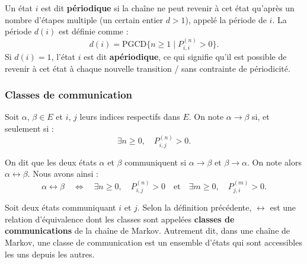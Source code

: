 \documentclass{article}
\begin{document}
\begin{tcolorbox}[colback=white,colframe=blue!80!black,title=État périodique]
Un état $i$ est dit \textbf{périodique} si la chaîne ne peut revenir à cet état qu'après un nombre d'étapes multiple (un certain entier $d > 1$), appelé la période de $i$. La période $d(i)$ est définie comme :
\[
d(i) = \text{PGCD}\{n \geq 1 \mid P_{i,i}^{(n)} > 0\}.
\]
Si $d(i) = 1$, l'état $i$ est dit \textbf{apériodique}, ce qui signifie qu'il est possible de revenir à cet état à chaque nouvelle transition /  sans contrainte de périodicité. \\
\end{tcolorbox}


\subsubsection{Classes de communication}

\begin{tcolorbox}[colback=white,colframe=yellow!80!black,title=Backup à modifier/supprimer]
Soit $\alpha$, $\beta \in E$ et $i$, $j$ leurs indices respectifs dans $E$. On note $\alpha \rightarrow \beta$ si, et seulement si :
\[
\exists n \geq 0, \quad P_{i,j}^{(n)} > 0.
\]

On dit que les deux états $\alpha$ et $\beta$ communiquent si $\alpha \rightarrow \beta$ et $\beta \rightarrow \alpha$. On note alors $\alpha \leftrightarrow \beta$. Nous avons ainsi :
\[
\alpha \leftrightarrow \beta \quad \iff \quad \exists n \geq 0, \quad P_{i,j}^{(n)} > 0 \quad \text{et} \quad \exists m \geq 0, \quad P_{j,i}^{(m)} > 0.
\]
\end{tcolorbox}

Soit deux états communiquant $i$ et $j$. Selon la définition précédente, $\leftrightarrow$ est une relation d'équivalence dont les classes sont appelées \textbf{classes de communications} de la chaîne de Markov.
Autrement dit, dans une chaîne de Markov, une classe de communication est un ensemble d'états qui sont accessibles les uns depuis les autres. \\
\end{document}
